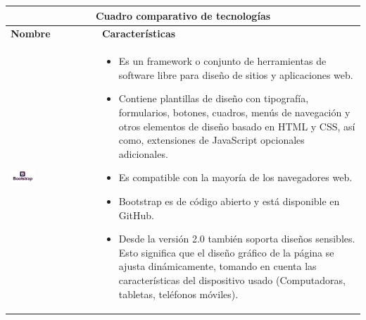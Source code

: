 \begin{table}[b!]
    \centering
      \begin{tabular}{|p{1cm}|l}
        \hline
        \multicolumn{2}{|c|}{{\bf Cuadro comparativo de tecnologías}} \\ 
        \hline
          \multicolumn{1}{|p{4cm}|}{{\bf Nombre}} & 
		  \multicolumn{1}{p{10cm}|}{{\bf Características}}\\
		 \hline
          \multicolumn{1}{|p{5cm}|}{\includegraphics[width=0.3\textwidth]{images/bootstrap}} & 
          \multicolumn{1}{p{10cm}|}{\begin{itemize} 
       \vspace{-20mm}
          \item Es un framework o conjunto de herramientas de software libre para diseño de sitios y aplicaciones web. 
        \item Contiene plantillas de diseño con tipografía, formularios, botones, cuadros, menús de navegación y otros elementos de diseño basado en HTML y CSS, así como, extensiones de JavaScript opcionales adicionales.
        \item Es compatible con la mayoría de los navegadores web.
        \item Bootstrap es de código abierto y está disponible en GitHub. 
        \item Desde la versión 2.0 también soporta diseños sensibles. Esto significa que el diseño gráfico de la página se ajusta dinámicamente, tomando en cuenta las características del dispositivo usado (Computadoras, tabletas, teléfonos móviles).
        \cite{34}
      \end{itemize}} \\
         

\end{tabular}
\end{table}
